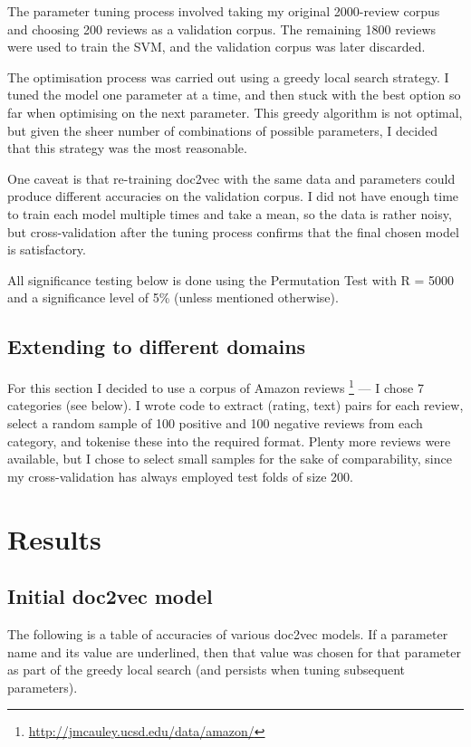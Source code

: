 \documentclass[12pt,a4paper,twoside]{article}
\begin{document}
The parameter tuning process involved taking my original 2000-review corpus and choosing 200 reviews as a validation corpus. The remaining 1800 reviews were used to train the SVM, and the validation corpus was later discarded.

The optimisation process was carried out using a greedy local search strategy. I tuned the model one parameter at a time, and then stuck with the best option so far when optimising on the next parameter. This greedy algorithm is not optimal, but given the sheer number of combinations of possible parameters, I decided that this strategy was the most reasonable.

One caveat is that re-training doc2vec with the same data and parameters could produce different accuracies on the validation corpus. I did not have enough time to train each model multiple times and take a mean, so the data is rather noisy, but cross-validation after the tuning process confirms that the final chosen model is satisfactory.

All significance testing below is done using the Permutation Test with R = 5000 and a significance level of 5\% (unless mentioned otherwise).

\subsection{Extending to different domains}

For this section I decided to use a corpus of Amazon reviews \footnote{\url{http://jmcauley.ucsd.edu/data/amazon/}} --- I chose 7 categories (see below). I wrote code to extract (rating, text) pairs for each review, select a random sample of 100 positive and 100 negative reviews from each category, and tokenise these into the required format. Plenty more reviews were available, but I chose to select small samples for the sake of comparability, since my cross-validation has always employed test folds of size 200.


\section{Results}

\subsection{Initial doc2vec model}

The following is a table of accuracies of various doc2vec models. If a parameter name and its value are underlined, then that value was chosen for that parameter as part of the greedy local search (and persists when tuning subsequent parameters).
\end{document}
